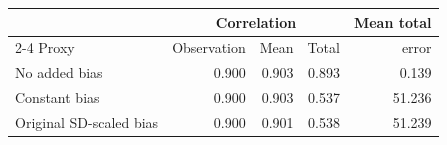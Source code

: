 \begin{tabular}{lrrrr}
\toprule
 & \multicolumn{3}{c}{Correlation} & Mean total \\
\cmidrule(lr){2-4}
Proxy & Observation & Mean & Total & error \\
\midrule
No added bias & 0.900 & 0.903 & 0.893 & 0.139 \\
Constant bias & 0.900 & 0.903 & 0.537 & 51.236 \\
Original SD-scaled bias & 0.900 & 0.901 & 0.538 & 51.239 \\
\bottomrule
\end{tabular}
